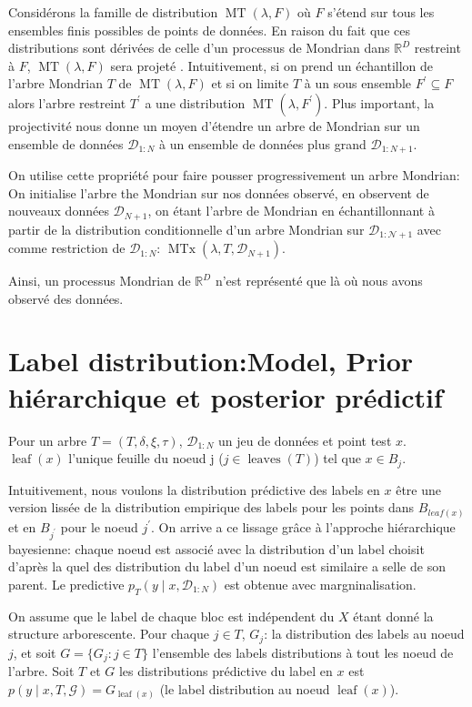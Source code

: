 Considérons la famille de distribution $\operatorname{MT}(\lambda,F)$ où $F$ s'étend sur tous les ensembles finis possibles de points de données. En raison du fait que ces distributions sont dérivées de celle d'un processus de Mondrian dans $\mathbb{R}^D$ restreint à $F$, $\operatorname{MT}(\lambda,F)$ sera projeté . Intuitivement, si on prend un échantillon de l'arbre Mondrian $T$ de  $\operatorname{MT}(\lambda,F)$ et si on limite $T$ à un sous ensemble $F^{\prime} \subseteq F$ alors l'arbre restreint $T^\prime$ a une distribution $\operatorname{MT}(\lambda,F^\prime)$. Plus important, la projectivité nous donne un moyen  d'étendre un arbre de Mondrian sur un ensemble de données $\mathcal{D}_{1:N}$ à un ensemble de données plus grand $\mathcal{D}_{1:N+1}$.

On utilise cette propriété pour faire pousser progressivement un arbre Mondrian:
On initialise l'arbre the Mondrian sur nos données observé, en observent de nouveaux données $\mathcal{D}_{N+1}$, on étant l'arbre de Mondrian en échantillonnant à partir de la distribution conditionnelle
d'un arbre Mondrian sur $\mathcal{D_{1:N+1}}$ avec comme restriction de $\mathcal{D}_{1:N}$: $\operatorname{MTx}\left(\lambda, T, \mathcal{D}_{N+1}\right)$.

Ainsi, un processus Mondrian de $\mathbb{R}^D$ n'est représenté que là où nous avons observé des données.

\section{Label distribution:Model, Prior hiérarchique et posterior prédictif}

Pour un arbre $T=(T,\delta,\xi,\tau)$, $\mathcal{D}_{1:N}$ un jeu de données et point test $x$. $\operatorname{leaf}(x)$ l'unique feuille du noeud j ($j\in \operatorname{leaves}(T)$) tel que $x\in B_j$.

Intuitivement, nous voulons la distribution prédictive des labels en $x$ être une version lissée de la distribution empirique des labels pour les points dans $B_{leaf(x)}$ et en $B_{j^\prime}$ pour le noeud $j^\prime$. On arrive a ce lissage grâce à l'approche hiérarchique bayesienne: chaque noeud est associé avec la distribution d'un label choisit d'après la quel des distribution du label d'un noeud est similaire a selle de son parent. Le predictive $p_{T}\left(y \mid x, \mathcal{D}_{1: N}\right)$ est obtenue avec margninalisation.

On assume que le label de chaque bloc est indépendent du $X$ étant donné la structure arborescente. Pour chaque $j\in T$, $G_j$: la distribution des labels au noeud $j$, et soit $G=\{G_j:j\in T\}$  l'ensemble des labels distributions à tout les noeud de l'arbre. Soit $T$ et $G$ les distributions prédictive du label en $x$ est $p(y \mid x, T, \mathcal{G})=G_{\operatorname{leaf}(x)}$ (le label distribution au noeud $\operatorname{leaf}(x)$).


